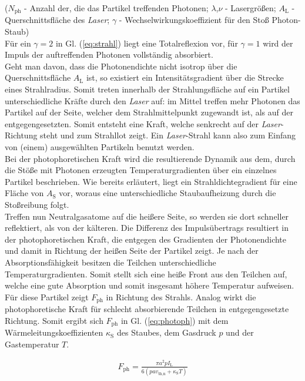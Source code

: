 \documentclass[numbers=noenddot,a4paper]{scrartcl}
\newcommand{\ix}[1]{_\text{#1}}
\newcommand{\tilt}[1]{\textit{#1}}
\begin{document}
				($N\ix{ph}$ - Anzahl der, die das Partikel treffenden Photonen; $\lambda$,$\nu$ - Lasergrößen; $A\ix{L}$ - Querschnittsfläche des \tilt{Laser}; $\gamma$ - Wechselwirkungskoeffizient für den Stoß Photon-Staub)\\
				Für ein $\gamma=2$ in Gl. (\ref{eq:strahl}) liegt eine Totalreflexion vor, für $\gamma=1$ wird der Impuls der auftreffenden Photonen vollständig absorbiert.\\
				Geht man davon, dass die Photonendichte nicht isotrop über die Querschnittsfläche $A\ix{L}$ ist, so existiert ein Intensitätsgradient über die Strecke eines Strahlradius. Somit treten innerhalb der Strahlungsfläche auf ein Partikel unterschiedliche Kräfte durch den \tilt{Laser} auf: im Mittel treffen mehr Photonen das Partikel auf der Seite, welcher dem Strahlmittelpunkt zugewandt ist, als auf der entgegengesetzten. Somit entsteht eine Kraft, welche senkrecht auf der \tilt{Laser}-Richtung steht und zum Strahllot zeigt. Ein \tilt{Laser}-Strahl kann also zum Einfang von (einem) ausgewählten Partikeln benutzt werden.\\
				Bei der photophoretischen Kraft wird die resultierende Dynamik aus dem, durch die Stöße mit Photonen erzeugten Temperaturgradienten über ein einzelnes Partikel beschrieben. Wie bereits erläutert, liegt ein Strahldichtegradient für eine Fläche von $A\ix{S}$ vor, woraus eine unterschiedliche Staubaufheizung durch die Stoßreibung folgt.\\
				Treffen nun Neutralgasatome auf die heißere Seite, so werden sie dort schneller reflektiert, als von der kälteren. Die Differenz des Impulsübertrags resultiert in der photophoretischen Kraft, die entgegen des Gradienten der Photonendichte und damit in Richtung der heißen Seite der Partikel zeigt. Je nach der Absorptionsfähigkeit besitzen die Teilchen unterschiedliche Temperaturgradienten. Somit stellt sich eine heiße Front aus den Teilchen auf, welche eine gute Absorption und somit insgesamt höhere Temperatur aufweisen. Für diese Partikel zeigt $F\ix{ph}$ in Richtung des Strahls. Analog wirkt die photophoretische Kraft für schlecht absorbierende Teilchen in entgegengesetzte Richtung. Somit ergibt sich $F\ix{ph}$ in Gl. (\ref{eq:photoph}) mit dem Wärmeleitungskoeffizienten $\kappa\ix{S}$ des Staubes, dem Gasdruck $p$ und der Gastemperatur $T$.
				
					\begin{align}
						F\ix{ph}=\frac{\pi a^2 p I\ix{L}}{6\left(pav\ix{th,n}+\kappa\ix{S}T\right)} \label{eq:photoph}
					\end{align}
				
\end{document}
